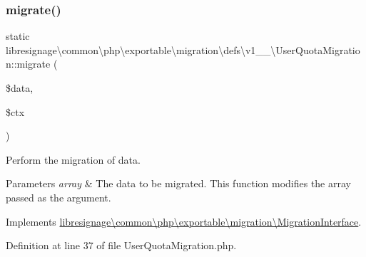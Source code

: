 \subsubsection{\texorpdfstring{migrate()}{migrate()}}
{\footnotesize\ttfamily static libresignage\textbackslash{}common\textbackslash{}php\textbackslash{}exportable\textbackslash{}migration\textbackslash{}defs\textbackslash{}v1\+\_\+\_\textbackslash{}\+User\+Quota\+Migration\+::migrate (\begin{DoxyParamCaption}\item[{array \&}]{\$data,  }\item[{\hyperlink{classlibresignage_1_1common_1_1php_1_1exportable_1_1ExportableDataContext}{Exportable\+Data\+Context}}]{\$ctx }\end{DoxyParamCaption})\hspace{0.3cm}{\ttfamily [static]}}

Perform the migration of data.


\begin{DoxyParams}{Parameters}
{\em array} & The data to be migrated. This function modifies the array passed as the argument. \\
\hline
\end{DoxyParams}


Implements \hyperlink{interfacelibresignage_1_1common_1_1php_1_1exportable_1_1migration_1_1MigrationInterface_a8275bfe14f59f19bb3b33b239fd48c5d}{libresignage\textbackslash{}common\textbackslash{}php\textbackslash{}exportable\textbackslash{}migration\textbackslash{}\+Migration\+Interface}.



Definition at line 37 of file User\+Quota\+Migration.\+php.

\mbox{\label{classlibresignage_1_1common_1_1php_1_1exportable_1_1migration_1_1defs_1_1v1__0__0_1_1UserQuotaMigration_afab87f3c95d902cd93f5932b88bec5df}} 
